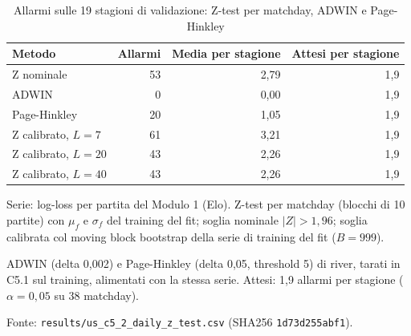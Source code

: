 \begin{table}[htbp]
\centering
\small
\caption{Allarmi sulle 19 stagioni di validazione: Z-test per matchday, ADWIN e Page-Hinkley}
\label{tab:c5_allarmi}
\begin{tabular}{lrrr}
\toprule
Metodo & Allarmi & Media per stagione & Attesi per stagione \\
\midrule
Z nominale & 53 & 2,79 & 1,9 \\
ADWIN & 0 & 0,00 & 1,9 \\
Page-Hinkley & 20 & 1,05 & 1,9 \\
Z calibrato, $L = 7$ & 61 & 3,21 & 1,9 \\
Z calibrato, $L = 20$ & 43 & 2,26 & 1,9 \\
Z calibrato, $L = 40$ & 43 & 2,26 & 1,9 \\
\bottomrule
\end{tabular}

\smallskip
\begin{minipage}{\linewidth}
\footnotesize
Serie: log-loss per partita del Modulo 1 (Elo). Z-test per matchday (blocchi di 10 partite) con $\mu_f$ e $\sigma_f$ del training del fit; soglia nominale $|Z| > 1{,}96$; soglia calibrata col moving block bootstrap della serie di training del fit ($B = 999$).\par
ADWIN (delta 0,002) e Page-Hinkley (delta 0,05, threshold 5) di river, tarati in C5.1 sul training, alimentati con la stessa serie. Attesi: 1,9 allarmi per stagione ($\alpha = 0{,}05$ su 38 matchday).\par
Fonte: \texttt{results/us\_c5\_2\_daily\_z\_test.csv} (SHA256 \texttt{1d73d255abf1}).
\end{minipage}
\end{table}
